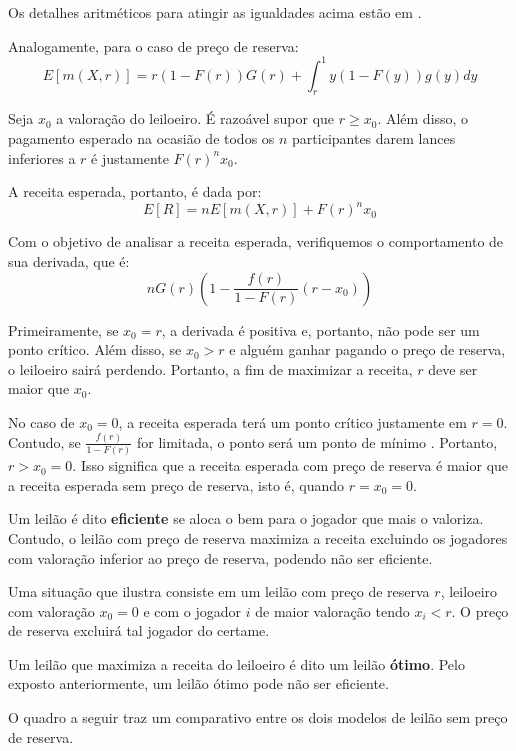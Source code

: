 Os detalhes aritméticos para atingir as igualdades acima estão em \citet{krishna}.

Analogamente, para o caso de preço de reserva:
\begin{equation*}
	E[m(X,r)] = r(1-F(r))G(r) + \int_r^1 y(1-F(y))g(y)dy
\end{equation*}

Seja $x_0$ a valoração do leiloeiro. É razoável supor que $r \geq x_0$. Além disso, o pagamento esperado na ocasião de todos os $n$ participantes darem lances inferiores a $r$ é justamente $F(r)^n x_0$.

A receita esperada, portanto, é dada por:
\begin{equation*}
	E[R] = n E[m(X,r)] + F(r)^n x_0
\end{equation*}

Com o objetivo de analisar a receita esperada, verifiquemos o comportamento de sua derivada, que é:
\begin{equation*}
	nG(r)\left(1-\frac{f(r)}{1-F(r)}(r-x_0)\right)
\end{equation*}

Primeiramente, se $x_0 = r$, a derivada é positiva e, portanto, não pode ser um ponto crítico. Além disso, se $x_0 > r$ e alguém ganhar pagando o preço de reserva, o leiloeiro sairá perdendo. Portanto, a fim de maximizar a receita, $r$ deve ser maior que $x_0$.

No caso de $x_0 = 0$, a receita esperada terá um ponto crítico justamente em $r = 0$. Contudo, se $\frac{f(r)}{1-F(r)}$ for limitada, o ponto será um ponto de mínimo \citet{krishna}. Portanto, $r > x_0 = 0$. Isso significa que a receita esperada com preço de reserva é maior que a receita esperada sem preço de reserva, isto é, quando $r = x_0 = 0$.

Um leilão é dito \textbf{eficiente} se aloca o bem para o jogador que mais o valoriza. Contudo, o leilão com preço de reserva maximiza a receita excluindo os jogadores com valoração inferior ao preço de reserva, podendo não ser eficiente.

Uma situação que ilustra consiste em um leilão com preço de reserva $r$, leiloeiro com valoração $x_0 = 0$ e com o jogador $i$ de maior valoração tendo $x_i < r$. O preço de reserva excluirá tal jogador do certame.

Um leilão que maximiza a receita do leiloeiro é dito um leilão \textbf{ótimo}. Pelo exposto anteriormente, um leilão ótimo pode não ser eficiente.

O quadro a seguir traz um comparativo entre os dois modelos de leilão sem preço de reserva.

